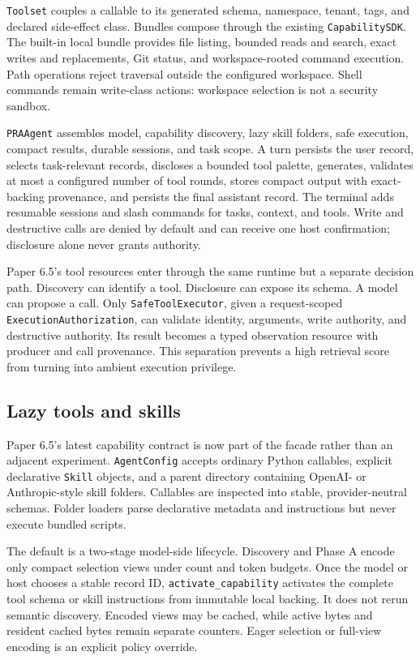 \documentclass[11pt]{article}
\begin{document}
\texttt{Toolset} couples a callable to its generated schema, namespace, tenant,
tags, and declared side-effect class. Bundles compose through the existing
\texttt{CapabilitySDK}. The built-in local bundle provides file listing,
bounded reads and search, exact writes and replacements, Git status, and
workspace-rooted command execution. Path operations reject traversal outside
the configured workspace. Shell commands remain write-class actions:
workspace selection is not a security sandbox.

\texttt{PRAAgent} assembles model, capability discovery, lazy skill folders,
safe execution, compact results, durable sessions, and task scope. A turn
persists the user record, selects task-relevant records, discloses a bounded
tool palette, generates, validates at most a configured number of tool rounds,
stores compact output with exact-backing provenance, and persists the final
assistant record. The terminal adds resumable sessions and slash commands for
tasks, context, and tools. Write and destructive calls are denied by default
and can receive one host confirmation; disclosure alone never grants authority.

Paper 6.5's tool resources enter through the same runtime but a separate
decision path.  Discovery can identify a tool.  Disclosure can expose its
schema.  A model can propose a call.  Only \texttt{SafeToolExecutor}, given a
request-scoped \texttt{ExecutionAuthorization}, can validate identity,
arguments, write authority, and destructive authority.  Its result becomes a
typed observation resource with producer and call provenance.  This separation
prevents a high retrieval score from turning into ambient execution privilege.

\subsection{Lazy tools and skills}

Paper 6.5's latest capability contract is now part of the facade rather than an
adjacent experiment.  \texttt{AgentConfig} accepts ordinary Python callables,
explicit declarative \texttt{Skill} objects, and a parent directory containing
OpenAI- or Anthropic-style skill folders.  Callables are inspected into stable,
provider-neutral schemas.  Folder loaders parse declarative metadata and
instructions but never execute bundled scripts.

The default is a two-stage model-side lifecycle.  Discovery and Phase A encode
only compact selection views under count and token budgets.  Once the model or
host chooses a stable record ID, \texttt{activate\_capability} activates the
complete tool schema or skill instructions from immutable local backing.  It
does not rerun semantic discovery.  Encoded views may be cached, while active
bytes and resident cached bytes remain separate counters.  Eager selection or
full-view encoding is an explicit policy override.
\end{document}
